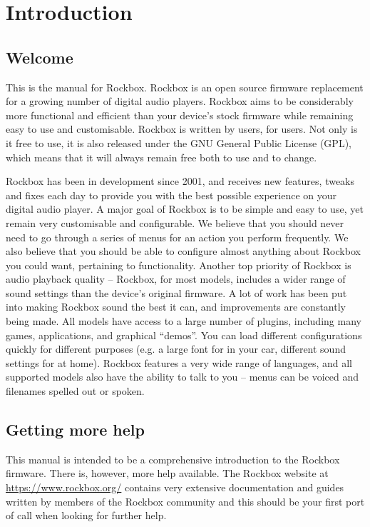 \chapter{Introduction}
\section{Welcome}
This is the manual for Rockbox. Rockbox is an open source firmware replacement
for a growing number of digital audio players. Rockbox aims to be considerably
more functional and efficient than your device's stock firmware while remaining
easy to use and customisable. Rockbox is written by users, for users. Not only
is it free to use, it is also released under the GNU General Public License
(GPL), which means that it will always remain free both to use and to change.

Rockbox has been in development since 2001, and receives new features, tweaks
and fixes each day to provide you with the best possible experience on your
digital audio player. A major goal of Rockbox is to be simple and easy to use,
yet remain very customisable and configurable. We believe that you should never
need to go through a series of menus for an action you perform frequently. We
also believe that you should be able to configure almost anything about Rockbox
you could want, pertaining to functionality. Another top priority of Rockbox is
audio playback quality -- Rockbox, for most models, includes a wider range of
sound settings than the device's original firmware. A lot of work has been put
into making Rockbox sound the best it can, and improvements are constantly being
made. All models have access to a large number of plugins, including many games,
applications, and graphical ``demos''. You can load different configurations
quickly for different purposes (e.g. a large font for in your car, different
sound settings for at home). Rockbox features a very wide range of languages, and
all supported models also have the ability to talk to you -- menus can be voiced
and filenames spelled out or spoken.

\section{Getting more help}
This manual is intended to be a comprehensive introduction to the Rockbox
firmware. There is, however, more help available. The Rockbox website at
\url{https://www.rockbox.org/} contains very extensive documentation and guides
written by members of the Rockbox community and this should be your first port
of call when looking for further help.

